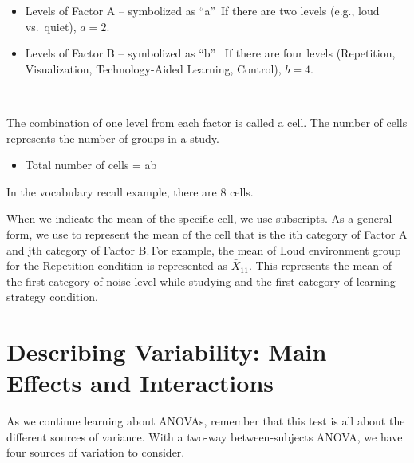 \documentclass[
  letterpaper,
  DIV=11,
  numbers=noendperiod]{scrreprt}
\providecommand{\tightlist}{%
  \setlength{\itemsep}{0pt}\setlength{\parskip}{0pt}}
\begin{document}
\begin{itemize}
\item
  Levels of Factor A -- symbolized as ``a''\, If there are two levels
  (e.g., loud vs.~quiet), \(a = 2\).\, \,
\item
  Levels of Factor B -- symbolized as ``b'' \, If there are four levels
  (Repetition, Visualization, Technology-Aided Learning, Control),
  \(b = 4\).\,\,
\end{itemize}

\,

The combination of one level from each factor is called a cell. The
number of cells represents the number of groups in a study.\,\,

\begin{itemize}
\tightlist
\item
  Total number of cells = ab\,
\end{itemize}

In the vocabulary recall example, there are 8 cells.\,\,

When we indicate the mean of the specific cell, we use subscripts. As a
general form, we use to represent the mean of the cell that is the ith
category of Factor A and jth category of Factor B.\,For example, the
mean of Loud environment group for the Repetition condition is
represented as \(\bar{X}_{11}\). This represents the mean of the first
category of noise level while studying and the first category of
learning strategy condition.

\section{Describing Variability: Main Effects and
Interactions\,}\label{describing-variability-main-effects-and-interactions}

As we continue learning about ANOVAs, remember that this test is all
about the different sources of variance. With a two-way between-subjects
ANOVA, we have four sources of variation to consider.
\end{document}
